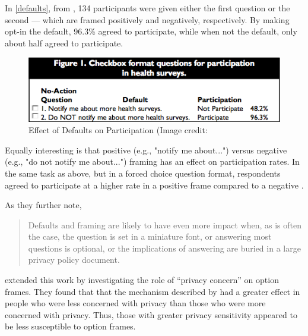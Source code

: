 In  \autoref{defaults},  from  \cite{Bellman:2001vq},  134 participants were given either the first question or the second --- which are framed positively and negatively, respectively. By making opt-in the default, 96.3\% agreed to participate, while when not the default, only about half agreed to participate.


\begin{figure}
\centerline{
  \includegraphics[scale=.5]{chapter5.tex/default2}
  }
\caption{Effect of Defaults on Participation (Image credit: \cite{Bellman:2001vq}}
\label{defaults}
\end{figure}

\begin{sloppier}
Equally interesting is that positive (e.g., "notify me about...") versus negative (e.g., "do not notify me about...") framing has an effect on participation rates. In the same task as above, but in a forced choice question format, respondents agreed to participate at a higher rate in a positive frame compared to a negative \citep{Bellman:2001vq}.
\end{sloppier}


As they further note,

\begin{quote}
Defaults and framing are likely to have even more impact when, as is often the case, the question is set in a miniature font, or answering most questions is optional, or the implications of answering are buried in a large privacy policy document. \citep[p. 25]{Bellman:2001vq}
\end{quote}

 \citet{Lai:2006ws}  extended this work by investigating the role of ``privacy concern'' on option frames. They found that that the mechanism described by  \citet{Bellman:2001vq}  had a greater effect in people who were less concerned with privacy than those who were more concerned with privacy. Thus, those with greater privacy sensitivity appeared to be less susceptible to option frames.

